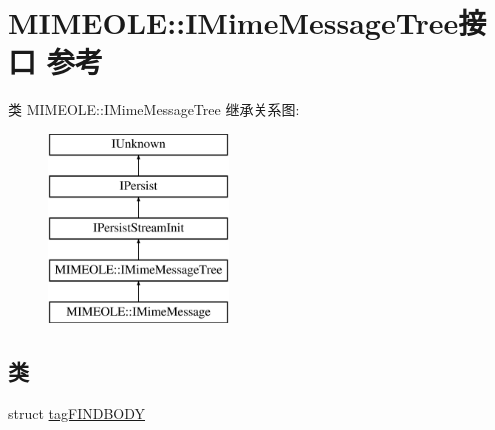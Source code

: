 \hypertarget{interface_m_i_m_e_o_l_e_1_1_i_mime_message_tree}{}\section{M\+I\+M\+E\+O\+LE\+:\+:I\+Mime\+Message\+Tree接口 参考}
\label{interface_m_i_m_e_o_l_e_1_1_i_mime_message_tree}
类 M\+I\+M\+E\+O\+LE\+:\+:I\+Mime\+Message\+Tree 继承关系图\+:\begin{figure}[H]
\begin{center}
\leavevmode
\includegraphics[height=5.000000cm]{interface_m_i_m_e_o_l_e_1_1_i_mime_message_tree}
\end{center}
\end{figure}
\subsection*{类}
\begin{DoxyCompactItemize}
\item 
struct \hyperlink{struct_m_i_m_e_o_l_e_1_1_i_mime_message_tree_1_1tag_f_i_n_d_b_o_d_y}{tag\+F\+I\+N\+D\+B\+O\+DY}
\end{DoxyCompactItemize}
